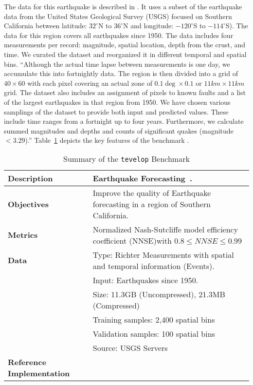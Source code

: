 The data for this earthquake is described in
\cite{las-22-mlcommons-science}.  It uses a subset of the earthquake
data from the United States Geological Survey (USGS) focused on Southern
California between latitude: $32^\circ$N to $36^\circ$N and longitude:
$-120^\circ$S to $-114^\circ$S). The data for this region covers all
earthquakes since 1950. The data includes four measurements per
record: magnitude, spatial location, depth from the crust, and
time. We curated the dataset and reorganized it in different
temporal and spatial bins. ``Although the actual time lapse between
measurements is one day, we accumulate this into fortnightly
data. The region is then divided into a grid of $40\times 60$ with
each pixel covering an actual zone of $0.1\deg\times 0.1$ or
$11km\times 11km$ grid. The dataset also includes an assignment of
pixels to known faults and a list of the largest earthquakes in that
region from 1950. We have chosen various samplings of the dataset to
provide both input and predicted values. These include time ranges
from a fortnight up to four years. Furthermore, we calculate summed
magnitudes and depths and counts of significant quakes (magnitude $<
3.29$).''  Table~\ref{tab:eq-summary} depicts the key features of the
benchmark \cite{las-22-mlcommons-science}.


\begin{small}
\begin{table}
\caption{Summary of the {\tt tevelop} Benchmark}\label{tab:eq-summary}
\begin{center}
\begin{tabular}{p{}p{}}
\hline
\hline
{\bf Description} & Earthquake Forecasting~\cite{fox2022-jm,TFT-21,eq-code,eq-data}.\\
\hline
{\bf Objectives} &  Improve the quality of Earthquake
forecasting in a region of Southern California.\\
\hline
{\bf Metrics} & Normalized Nash-Sutcliffe model efficiency coefficient (NNSE)with $0.8\leq NNSE\leq 0.99$\\
\hline
{\bf Data}  & Type:  Richter Measurements with spatial and temporal information (Events). \\
  &  Input:  Earthquakes since 1950.\\
  &  Size:  11.3GB (Uncompressed), 21.3MB (Compressed)\\
  & Training samples: 2,400 spatial bins\\
  & Validation samples:   100 spatial bins\\
  & Source:  USGS Servers~\cite{eq-data}\\
\hline
{\bf Reference Implementation} & \cite{eq-code}\\
\hline
\end{tabular}
\end{center}
\end{table}
\end{small}


